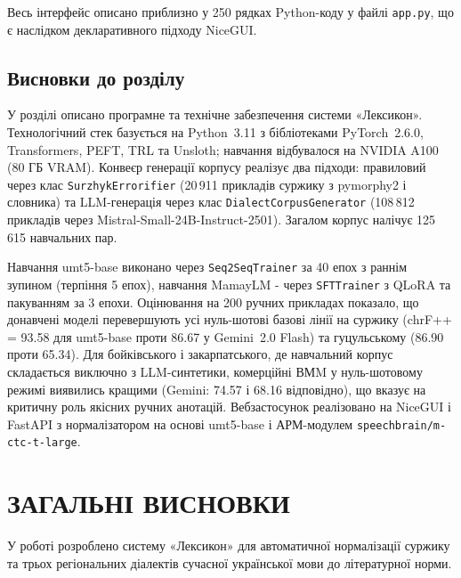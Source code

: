 \documentclass[14pt]{extarticle}
\let\oldaddcontentsline\addcontentsline
\renewcommand{\addcontentsline}[3]{\phantomsection\oldaddcontentsline{#1}{#2}{#3}}
\begin{document}
Весь інтерфейс описано приблизно у 250 рядках Python-коду у файлі \texttt{app.py}, що є наслідком декларативного підходу NiceGUI.

\subsection{Висновки до розділу}

У розділі описано програмне та технічне забезпечення системи «Лексикон». Технологічний стек базується на Python~3.11 з бібліотеками PyTorch~2.6.0, Transformers, PEFT, TRL та Unsloth; навчання відбувалося на NVIDIA A100 (80 ГБ VRAM). Конвеєр генерації корпусу реалізує два підходи: правиловий через клас \texttt{SurzhykErrorifier} (20\,911 прикладів суржику з pymorphy2 і словника) та LLM-генерація через клас \texttt{DialectCorpusGenerator} (108\,812 прикладів через Mistral-Small-24B-Instruct-2501). Загалом корпус налічує 125\,615 навчальних пар.

Навчання umt5-base виконано через \texttt{Seq2SeqTrainer} за 40 епох з раннім зупином (терпіння 5 епох), навчання MamayLM - через \texttt{SFTTrainer} з QLoRA та пакуванням за 3 епохи. Оцінювання на 200 ручних прикладах показало, що донавчені моделі перевершують усі нуль-шотові базові лінії на суржику (chrF++ = 93.58 для umt5-base проти 86.67 у Gemini~2.0 Flash) та гуцульському (86.90 проти 65.34). Для бойківського і закарпатського, де навчальний корпус складається виключно з LLM-синтетики, комерційні ВМM у нуль-шотовому режимі виявились кращими (Gemini: 74.57 і 68.16 відповідно), що вказує на критичну роль якісних ручних анотацій. Вебзастосунок реалізовано на NiceGUI і FastAPI з нормалізатором на основі umt5-base і АРМ-модулем \texttt{speechbrain/m-ctc-t-large}.

\clearpage

\section*{ЗАГАЛЬНІ ВИСНОВКИ}

У роботі розроблено систему «Лексикон» для автоматичної нормалізації суржику та трьох регіональних діалектів сучасної української мови до літературної норми.
\end{document}
